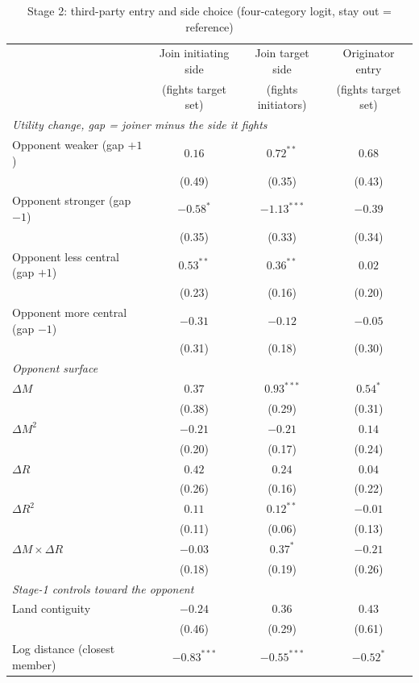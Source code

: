 \documentclass[11pt]{article}
\begin{document}
\clearpage
\begin{table}[!htbp]\centering\small
\caption{Stage 2: third-party entry and side choice (four-category logit, stay out = reference)}\label{tab:stage2}
\begin{tabular}{lccc}
\toprule
 & Join initiating side & Join target side & Originator entry \\
 & (fights target set) & (fights initiators) & (fights target set) \\
\midrule
\multicolumn{4}{l}{\emph{Utility change, gap = joiner minus the side it fights}} \\
Opponent weaker (gap $+1$) & $0.16$ & $0.72^{**}$ & $0.68$ \\
 & (0.49) & (0.35) & (0.43) \\
Opponent stronger (gap $-1$) & $-0.58^{*}$ & $-1.13^{***}$ & $-0.39$ \\
 & (0.35) & (0.33) & (0.34) \\
Opponent less central (gap $+1$) & $0.53^{**}$ & $0.36^{**}$ & $0.02$ \\
 & (0.23) & (0.16) & (0.20) \\
Opponent more central (gap $-1$) & $-0.31$ & $-0.12$ & $-0.05$ \\
 & (0.31) & (0.18) & (0.30) \\
\midrule
\multicolumn{4}{l}{\emph{Opponent surface}} \\
$\Delta M$ & $0.37$ & $0.93^{***}$ & $0.54^{*}$ \\
 & (0.38) & (0.29) & (0.31) \\
$\Delta M^2$ & $-0.21$ & $-0.21$ & $0.14$ \\
 & (0.20) & (0.17) & (0.24) \\
$\Delta R$ & $0.42$ & $0.24$ & $0.04$ \\
 & (0.26) & (0.16) & (0.22) \\
$\Delta R^2$ & $0.11$ & $0.12^{**}$ & $-0.01$ \\
 & (0.11) & (0.06) & (0.13) \\
$\Delta M \times \Delta R$ & $-0.03$ & $0.37^{*}$ & $-0.21$ \\
 & (0.18) & (0.19) & (0.26) \\
\midrule
\multicolumn{4}{l}{\emph{Stage-1 controls toward the opponent}} \\
Land contiguity & $-0.24$ & $0.36$ & $0.43$ \\
 & (0.46) & (0.29) & (0.61) \\
Log distance (closest member) & $-0.83^{***}$ & $-0.55^{***}$ & $-0.52^{*}$ \\

\end{tabular}
\end{table}
\end{document}
